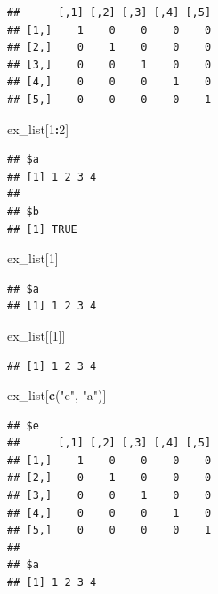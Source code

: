 \documentclass[]{book}
\newenvironment{Shaded}{\begin{snugshade}}{\end{snugshade}}
\newcommand{\KeywordTok}[1]{\textcolor[rgb]{0.13,0.29,0.53}{\textbf{#1}}}
\newcommand{\DecValTok}[1]{\textcolor[rgb]{0.00,0.00,0.81}{#1}}
\newcommand{\StringTok}[1]{\textcolor[rgb]{0.31,0.60,0.02}{#1}}
\newcommand{\CommentTok}[1]{\textcolor[rgb]{0.56,0.35,0.01}{\textit{#1}}}
\newcommand{\OperatorTok}[1]{\textcolor[rgb]{0.81,0.36,0.00}{\textbf{#1}}}
\newcommand{\NormalTok}[1]{#1}
\theoremstyle{definition}
\theoremstyle{definition}
\theoremstyle{definition}
\theoremstyle{remark}
\begin{document}
\begin{Shaded}
\end{Shaded}

\begin{verbatim}
##      [,1] [,2] [,3] [,4] [,5]
## [1,]    1    0    0    0    0
## [2,]    0    1    0    0    0
## [3,]    0    0    1    0    0
## [4,]    0    0    0    1    0
## [5,]    0    0    0    0    1
\end{verbatim}

\begin{Shaded}
\begin{Highlighting}[]
\NormalTok{ex_list[}\DecValTok{1}\OperatorTok{:}\DecValTok{2}\NormalTok{]}
\end{Highlighting}
\end{Shaded}

\begin{verbatim}
## $a
## [1] 1 2 3 4
## 
## $b
## [1] TRUE
\end{verbatim}

\begin{Shaded}
\begin{Highlighting}[]
\NormalTok{ex_list[}\DecValTok{1}\NormalTok{]}
\end{Highlighting}
\end{Shaded}

\begin{verbatim}
## $a
## [1] 1 2 3 4
\end{verbatim}

\begin{Shaded}
\begin{Highlighting}[]
\NormalTok{ex_list[[}\DecValTok{1}\NormalTok{]]}
\end{Highlighting}
\end{Shaded}

\begin{verbatim}
## [1] 1 2 3 4
\end{verbatim}

\begin{Shaded}
\begin{Highlighting}[]
\NormalTok{ex_list[}\KeywordTok{c}\NormalTok{(}\StringTok{"e"}\NormalTok{, }\StringTok{"a"}\NormalTok{)]}
\end{Highlighting}
\end{Shaded}

\begin{verbatim}
## $e
##      [,1] [,2] [,3] [,4] [,5]
## [1,]    1    0    0    0    0
## [2,]    0    1    0    0    0
## [3,]    0    0    1    0    0
## [4,]    0    0    0    1    0
## [5,]    0    0    0    0    1
## 
## $a
## [1] 1 2 3 4
\end{verbatim}
\end{document}
